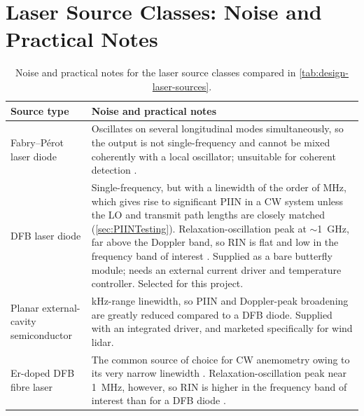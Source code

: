 \chapter{Laser Source Classes: Noise and Practical Notes}
\label{appendix:laserSourceNotes}
\begin{table}[H]
\centering\small
\renewcommand{\arraystretch}{1.2}
\begin{tabular}{@{}>{\raggedright\arraybackslash}p{}>{\raggedright\arraybackslash}p{}@{}}
\toprule
\textbf{Source type} & \textbf{Noise and practical notes} \\
\midrule
Fabry--P\'erot laser diode &
Oscillates on several longitudinal modes simultaneously, so the output is not single-frequency and cannot be mixed coherently with a local oscillator; unsuitable for coherent detection \cite{harris_role_1998}. \\
\addlinespace
DFB laser diode &
Single-frequency, but with a linewidth of the order of MHz, which gives rise to significant PIIN in a CW system unless the LO and transmit path lengths are closely matched (\autoref{sec:PIINTesting}). Relaxation-oscillation peak at $\sim$\SI{1}{\giga\hertz}, far above the Doppler band, so RIN is flat and low in the frequency band of interest \cite{cariou2006laser}. Supplied as a bare butterfly module; needs an external current driver and temperature controller. Selected for this project. \\
\addlinespace
Planar external-cavity semiconductor &
kHz-range linewidth, so PIIN and Doppler-peak broadening are greatly reduced compared to a DFB diode. Supplied with an integrated driver, and marketed specifically for wind lidar. \\
\addlinespace
Er-doped DFB fibre laser &
The common source of choice for CW anemometry owing to its very narrow linewidth \cite{cariou2006laser,hill_remote_nodate,abdelazim_development_2015}. Relaxation-oscillation peak near \SI{1}{\mega\hertz}, however, so RIN is higher in the frequency band of interest than for a DFB diode \cite{cariou2006laser}. \\
\bottomrule
\end{tabular}
\caption{Noise and practical notes for the laser source classes compared in \autoref{tab:design-laser-sources}.}
\label{tab:laser-sources-notes}
\end{table}
